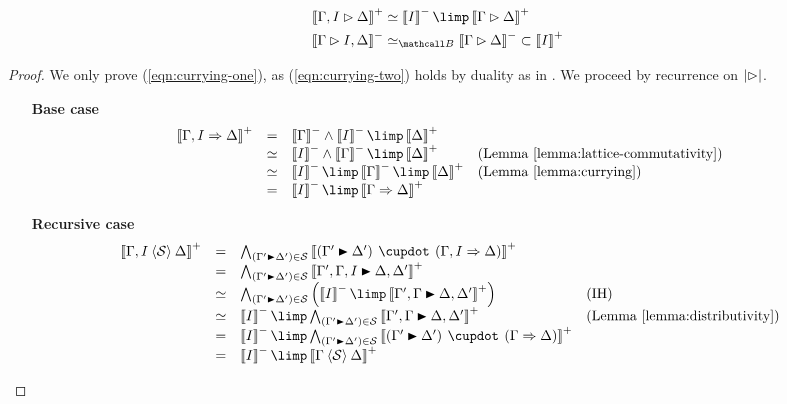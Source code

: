 \begin{lemma}
  \begin{align}
    \psint{\Gamma, I \J \Delta} &\semequiv \nsint{I} \limp \psint{\Gamma \J \Delta} \label{eqn:currying-one} \\
    \nsint{\Gamma \J I, \Delta} &\semequiv_{\Brouwer} \nsint{\Gamma \J \Delta} \lsub \psint{I} \label{eqn:currying-two}
  \end{align}
\end{lemma}
\begin{proof}
  We only prove (\ref{eqn:currying-one}), as (\ref{eqn:currying-two}) holds by
  duality as in . We proceed by recurrence on
  $\left|\mathbin{\rhd}\right|$.
  \begin{itemize}
    \item[\textbf{Base case}]
    $$
    \begin{array}{rcll}
      \psint{\Gamma, I \seq \Delta}
      &=& \nsint{\Gamma} \land \nsint{I} \limp \psint{\Delta} & \\
      &\semequiv& \nsint{I} \land \nsint{\Gamma} \limp \psint{\Delta} &\text{(\reflemma{lattice-commutativity})} \\
      &\semequiv& \nsint{I} \limp \nsint{\Gamma} \limp \psint{\Delta} &\text{(\reflemma{currying})} \\
      &=& \nsint{I} \limp \psint{\Gamma \seq \Delta} & \\
    \end{array}
    $$
    \item[\textbf{Recursive case}]
    $$
    \begin{array}{rcll}
      \psint{\Gamma, I \piq{\cS} \Delta}
      &=& \psintAndMix{(\Gamma' \JB \Delta')}{\cS}{\Gamma, I}{\Delta} & \\
      &=& \psintAnd{(\Gamma' \JB \Delta')}{\cS}{\Gamma', \Gamma, I \JB \Delta, \Delta'} & \\
      &\semequiv& \bigwedge_{(\Gamma' \JB \Delta') \in \cS}{\left(\nsint{I} \limp \psint{\Gamma', \Gamma \JB \Delta, \Delta'}\right)} &\text{(IH)} \\
      &\semequiv& \nsint{I} \limp \bigwedge_{(\Gamma' \JB \Delta') \in \cS}{\psint{\Gamma', \Gamma \JB \Delta, \Delta'}} &\text{(\reflemma{distributivity})} \\
      &=& \nsint{I} \limp \bigwedge_{(\Gamma' \JB \Delta') \in \cS}{\psint{(\Gamma' \JB \Delta') \mix (\Gamma \seq \Delta)}} & \\
      &=& \nsint{I} \limp \psint{\Gamma \piq{\cS} \Delta} & \\
    \end{array}
    $$
  \end{itemize}
\end{proof}

